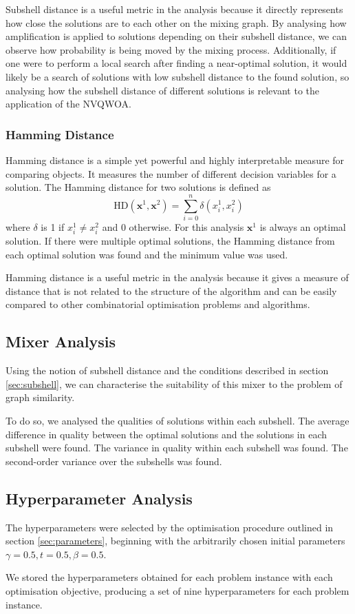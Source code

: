 Subshell distance is a useful metric in the analysis because it directly represents how close the solutions are to each other on the mixing graph. By analysing how amplification is applied to solutions depending on their subshell distance, we can observe how probability is being moved by the mixing process. Additionally, if one were to perform a local search after finding a near-optimal solution, it would likely be a search of solutions with low subshell distance to the found solution, so analysing how the subshell distance of different solutions is relevant to the application of the NVQWOA.

\subsubsection{Hamming Distance}
Hamming distance is a simple yet powerful and highly interpretable measure for comparing objects. It measures the number of different decision variables for a solution. The Hamming distance for two solutions is defined as 
$$\text{HD}(\mathbf{x}^1,\mathbf{x}^2)=\sum_{i=0}^n \delta(x^1_i,x^2_i)$$
where $\delta$ is 1 if $x^1_i\neq x^2_i$ and 0 otherwise. For this analysis $\mathbf{x}^1$ is always an optimal solution. If there were multiple optimal solutions, the Hamming distance from each optimal solution was found and the minimum value was used.

Hamming distance is a useful metric in the analysis because it gives a measure of distance that is not related to the structure of the algorithm and can be easily compared to other combinatorial optimisation problems and algorithms.

\subsection{Mixer Analysis}
Using the notion of subshell distance and the conditions described in section \ref{sec:subshell}, we can characterise the suitability of this mixer to the problem of graph similarity. 

To do so, we analysed the qualities of solutions within each subshell. The average difference in quality between the optimal solutions and the solutions in each subshell were found. The variance in quality within each subshell was found. The second-order variance over the subshells was found.



\subsection{Hyperparameter Analysis}
The hyperparameters were selected by the optimisation procedure outlined in section \ref{sec:parameters}, beginning with the arbitrarily chosen initial parameters $\gamma=0.5, t=0.5, \beta=0.5$.

We stored the hyperparameters obtained for each problem instance with each optimisation objective, producing a set of nine hyperparameters for each problem instance.